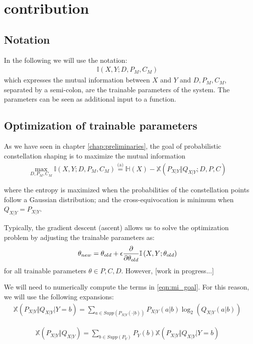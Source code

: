 \chapter{contribution}\label{chap:contribution}
\section{Notation}
In the following we will use the notation:
\begin{align*}
	\mathbb{I} \left(X , Y; D, P_M, C_M \right)
\end{align*}
which expresses the mutual information between $X$ and $Y$ and $D, P_M, C_M$, separated by a semi-colon, are the trainable parameters of the system. The parameters can be seen as additional input to a function.
\section{Optimization of trainable parameters}
As we have seen in chapter \ref{chap:preliminaries}, the goal of probabilistic constellation shaping is to maximize the mutual information
\begin{align}
\label{eqn:mi_goal}
	 \max_{D, P_M, C_M} \mathbb{I} \left(X , Y ; D, P_M, C_M \right) \overset{\text{(a)}}{=} \mathbb{H}(X) - \mathbb{X}(P_{X|Y} \Vert Q_{X|Y} ; D,P,C)
\end{align}

where the entropy is maximized when the probabilities of the constellation points follow a  Gaussian distribution; and the cross-equivocation is minimum when $Q_{X|Y} = P_{X|Y}$.

Typically, the gradient descent (ascent) allows us to solve the optimization problem by adjusting the trainable parameters as:
\begin{align}
	\theta_{new} = \theta_{old} + \epsilon \pdv{\theta_{old}} \mathbb{I} \left(X , Y ; \theta_{old} \right)
\end{align}
for all trainable parameters $\theta \in P, C, D$. However, [work in progress...]

We will need to numerically compute the terms in \ref{eqn:mi_goal}. For this reason, we will use the following expansions:
\begin{align}
	\mathbb{X}\left(P_{X|Y} \Vert Q_{X|Y} \vert Y=b \right) = \sum \limits_{a \in Supp(P_{X|Y}(\cdot|b))} P_{X|Y}(a|b) \log_2(Q_{X|Y}(a|b))
\end{align}

\begin{align}
	\mathbb{X}\left(P_{X|Y} \Vert Q_{X|Y}\right) = \sum \limits_{b \in Supp(P_Y)} P_Y(b) \mathbb{X}\left( P_{X|Y} \Vert Q_{X|Y} \vert Y=b \right) 
\end{align}

